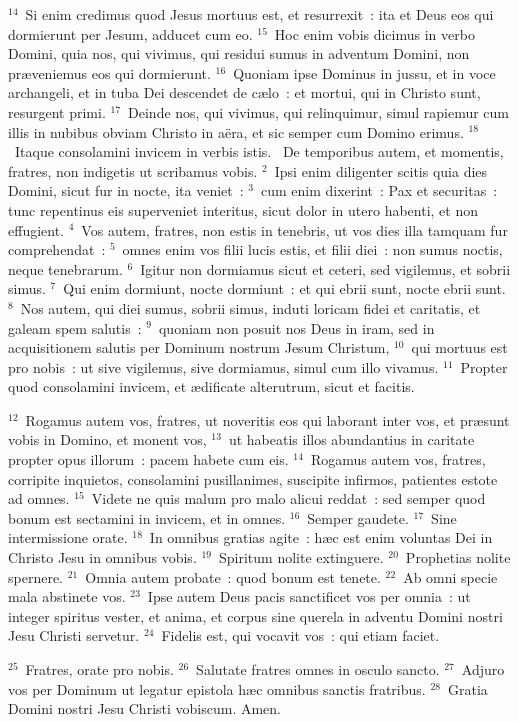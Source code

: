 ${}^{14}$~Si enim credimus quod Jesus mortuus est, et resurrexit~: ita et Deus eos qui dormierunt per Jesum, adducet cum eo.
${}^{15}$~Hoc enim vobis dicimus in verbo Domini, quia nos, qui vivimus, qui residui sumus in adventum Domini, non pr\ae veniemus eos qui dormierunt.
${}^{16}$~Quoniam ipse Dominus in jussu, et in voce archangeli, et in tuba Dei descendet de c\ae lo~: et mortui, qui in Christo sunt, resurgent primi.
${}^{17}$~Deinde nos, qui vivimus, qui relinquimur, simul rapiemur cum illis in nubibus obviam Christo in a\"era, et sic semper cum Domino erimus.
${}^{18}$~Itaque consolamini invicem in verbis istis.
~\lettrine[lines=10,image=true,loversize=0.05,lraise=-0.03]{D}{}e temporibus autem, et momentis, fratres, non indigetis ut scribamus vobis.
${}^{2}$~Ipsi enim diligenter scitis quia dies Domini, sicut fur in nocte, ita veniet~:
${}^{3}$~cum enim dixerint~: Pax et securitas~: tunc repentinus eis superveniet interitus, sicut dolor in utero habenti, et non effugient.
${}^{4}$~Vos autem, fratres, non estis in tenebris, ut vos dies illa tamquam fur comprehendat~:
${}^{5}$~omnes enim vos filii lucis estis, et filii diei~: non sumus noctis, neque tenebrarum.
${}^{6}$~Igitur non dormiamus sicut et ceteri, sed vigilemus, et sobrii simus.
${}^{7}$~Qui enim dormiunt, nocte dormiunt~: et qui ebrii sunt, nocte ebrii sunt.
${}^{8}$~Nos autem, qui diei sumus, sobrii simus, induti loricam fidei et caritatis, et galeam spem salutis~:
${}^{9}$~quoniam non posuit nos Deus in iram, sed in acquisitionem salutis per Dominum nostrum Jesum Christum,
${}^{10}$~qui mortuus est pro nobis~: ut sive vigilemus, sive dormiamus, simul cum illo vivamus.
${}^{11}$~Propter quod consolamini invicem, et \ae dificate alterutrum, sicut et facitis.


${}^{12}$~Rogamus autem vos, fratres, ut noveritis eos qui laborant inter vos, et pr\ae sunt vobis in Domino, et monent vos,
${}^{13}$~ut habeatis illos abundantius in caritate propter opus illorum~: pacem habete cum eis.
${}^{14}$~Rogamus autem vos, fratres, corripite inquietos, consolamini pusillanimes, suscipite infirmos, patientes estote ad omnes.
${}^{15}$~Videte ne quis malum pro malo alicui reddat~: sed semper quod bonum est sectamini in invicem, et in omnes.
${}^{16}$~Semper gaudete.
${}^{17}$~Sine intermissione orate.
${}^{18}$~In omnibus gratias agite~: h\ae c est enim voluntas Dei in Christo Jesu in omnibus vobis.
${}^{19}$~Spiritum nolite extinguere.
${}^{20}$~Prophetias nolite spernere.
${}^{21}$~Omnia autem probate~: quod bonum est tenete.
${}^{22}$~Ab omni specie mala abstinete vos.
${}^{23}$~Ipse autem Deus pacis sanctificet vos per omnia~: ut integer spiritus vester, et anima, et corpus sine querela in adventu Domini nostri Jesu Christi servetur.
${}^{24}$~Fidelis est, qui vocavit vos~: qui etiam faciet.


${}^{25}$~Fratres, orate pro nobis.
${}^{26}$~Salutate fratres omnes in osculo sancto.
${}^{27}$~Adjuro vos per Dominum ut legatur epistola h\ae c omnibus sanctis fratribus.
${}^{28}$~Gratia Domini nostri Jesu Christi vobiscum. Amen.
